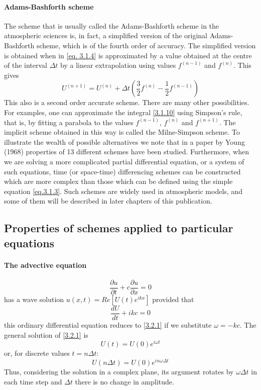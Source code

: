 \paragraph{Adams-Bashforth scheme}
The scheme that is usually called the Adams-Bashforth scheme in the atmospheric sciences is, in fact, a simplified version of the original Adams-Bashforth scheme, which is of the fourth order of accuracy. The simplified version is obtained when 
 in \ref{eq. 3.1.4} is approximated by a value obtained at the centre of the interval $\Delta t$ by a linear extrapolation using values $f^{(n-1)}$ and $f^{(n)}$. This gives
 \begin{equation}\label{3.1.12}
     U^{(n+1)}=U^{(n)}+\Delta t\left(\frac{3}{2}f^{(n)}-\frac{1}{2}f^{(n-1)}\right)
 \end{equation}
 This also is a second order accurate scheme.
 There are many other possibilities. For examples, one can approximate the integral \ref{3.1.10} using Simpson's rule, that is, by fitting a parabola to the values $f^{(n-1)}$, $f^{(n)}$ and $f^{(n+1)}$. 
 The implicit scheme obtained in this way is called the Milne-Simpson scheme. To illustrate the wealth of possible alternatives we note that in a paper by Young (1968) properties of 13 different schemes have been studied. Furthermore, when we are solving a more complicated partial differential equation, or a system of such equations, time (or space-time) differencing schemes can be constructed which are more complex than those which can be defined using the simple equation \ref{eq.3.1.3}. Such schemes are widely used in atmospheric models, and some of them will be described in later chapters of this publication.

 
\subsection{Properties of schemes applied to particular equations}
\paragraph{The advective equation} $$\frac{\partial u}{\partial t}+c\frac{\partial u}{\partial x}=0$$
has a wave solution $u(x,t)=Re[U(t)e^{ikx}]$ provided that
$$\frac{dU}{dt}+ikc=0$$
this ordinary differential equation reduces to \ref{3.2.1} if we substitute $\omega=-kc$.
The general solution of \ref{3.2.1} is 
$$U(t)=U(0)e^{i\omega t}$$
or, for discrete values $t=n\Delta t$:
\begin{equation}
    U(n\Delta t)=U(0)e^{in\omega\Delta t}
\end{equation}
Thus, considering the solution in a complex plane, its argument rotates by $\omega\Delta t$ in each time step and $\Delta t$ there is no change in amplitude.


